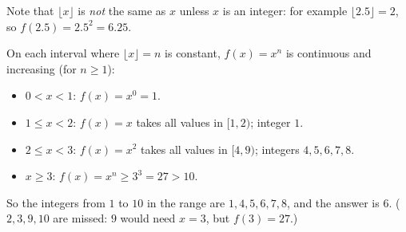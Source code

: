 Note that $\lfloor x\rfloor$ is \emph{not} the same as $x$ unless $x$ is an integer: for example $\lfloor2.5\rfloor=2$, so $f(2.5)=2.5^2=6.25$.

On each interval where $\lfloor x\rfloor=n$ is constant, $f(x)=x^n$ is continuous and increasing (for $n\ge1$):
\begin{itemize}
\item $0<x<1$: $f(x)=x^0=1$.
\item $1\le x<2$: $f(x)=x$ takes all values in $[1,2)$; integer $1$.
\item $2\le x<3$: $f(x)=x^2$ takes all values in $[4,9)$; integers $4,5,6,7,8$.
\item $x\ge3$: $f(x)=x^n\ge3^3=27>10$.
\end{itemize}
So the integers from $1$ to $10$ in the range are $1,4,5,6,7,8$, and the answer is $\boxed{6}$. ($2,3,9,10$ are missed: $9$ would need $x=3$, but $f(3)=27$.)
